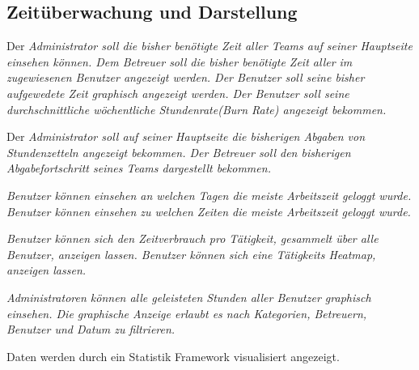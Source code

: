 \subsection{Zeitüberwachung und Darstellung}
    \begin{requirements}
        \begin{requirements}
             Der \em{Administrator} soll die bisher benötigte Zeit aller \em{Teams} auf seiner \em{Hauptseite} einsehen können.
             Dem \em{Betreuer} soll die bisher benötigte Zeit aller im zugewiesenen \em{Benutzer} angezeigt werden.
             Der \em{Benutzer} soll seine bisher aufgewedete Zeit graphisch angezeigt werden.
             Der \em{Benutzer} soll seine durchschnittliche wöchentliche Stundenrate(Burn Rate) angezeigt bekommen.
        \end{requirements}

        \begin{requirements}
             Der \em{Administrator} soll auf seiner \em{Hauptseite} die bisherigen \em{Abgaben} von \em{Stundenzetteln} angezeigt bekommen.
             Der \em{Betreuer} soll den bisherigen Abgabefortschritt seines \em{Teams} dargestellt bekommen.
        \end{requirements}

        \begin{requirements}
             \em{Benutzer} können einsehen an welchen Tagen die meiste Arbeitszeit geloggt wurde.
             \em{Benutzer} können einsehen zu welchen Zeiten die meiste Arbeitszeit geloggt wurde.
        \end{requirements}

        \begin{requirements}
             \em{Benutzer} können sich den Zeitverbrauch pro Tätigkeit, gesammelt über alle \em{Benutzer}, anzeigen lassen.
             \em{Benutzer} können sich eine Tätigkeits \em{Heatmap}, anzeigen lassen.
        \end{requirements}
        
        \begin{requirements}
              \em{Administratoren} können alle geleisteten Stunden aller \em{Benutzer} graphisch einsehen.
              Die graphische Anzeige erlaubt es nach \em{Kategorien}, \em{Betreuern}, \em{Benutzer} und Datum zu filtrieren.
        \end{requirements}

        Daten werden durch ein Statistik Framework visualisiert angezeigt.
    \end{requirements}

